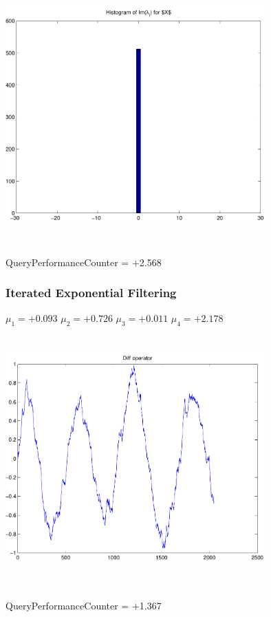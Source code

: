 \documentclass[9pt]{article}
\theoremstyle{plain}
\theoremstyle{definition}
\theoremstyle{remark}
\numberwithin{equation}{section}
\begin{document}
\includegraphics[width=10.0cm,height=10.0cm]{Im_lambda_n.pdf}

QueryPerformanceCounter  =  +2.568
\subsubsection{Iterated Exponential Filtering }
$\mu_1 =+0.093$
$\mu_2 =+0.726$
$\mu_3 =+0.011$
$\mu_4 =+2.178$
\includegraphics[width=10.0cm,height=10.0cm]{DIFF.pdf}

QueryPerformanceCounter  =  +1.367
\end{document}

